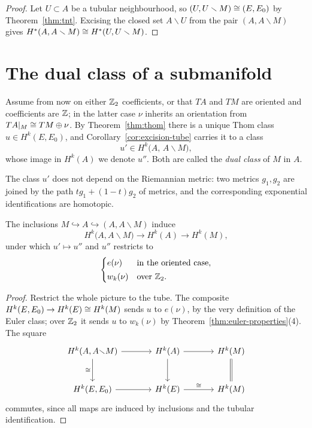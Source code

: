 \begin{proof}
Let $U\subset A$ be a tubular neighbourhood, so $(U,U\smallsetminus M)\cong
(E,E_0)$ by Theorem~\ref{thm:tnt}. Excising the closed set
$A\smallsetminus U$ from the pair $(A,A\smallsetminus M)$ gives
$H^*(A,A\smallsetminus M)\cong H^*(U,U\smallsetminus M)$.
\end{proof}

\section{The dual class of a submanifold}

Assume from now on either $\mathbb{Z}_2$ coefficients, or that $TA$ and $TM$ are
oriented and coefficients are $\mathbb{Z}$; in the latter case $\nu$ inherits an
orientation from $TA|_M\cong TM\oplus\nu$. By Theorem~\ref{thm:thom} there is a
unique Thom class $u\in H^k(E,E_0)$, and Corollary~\ref{cor:excision-tube}
carries it to a class
\[
u'\in H^k\big(A,\,A\smallsetminus M\big),
\]
whose image in $H^k(A)$ we denote $u''$. Both are called the \emph{dual class}
of $M$ in $A$.

\begin{remark}
The class $u'$ does not depend on the Riemannian metric: two metrics $g_1,g_2$
are joined by the path $tg_1+(1-t)g_2$ of metrics, and the corresponding
exponential identifications are homotopic.
\end{remark}

\begin{theorem}\label{thm:dual-restricts-euler}
The inclusions $M\hookrightarrow A\hookrightarrow(A,A\smallsetminus M)$ induce
\[
H^k\big(A,A\smallsetminus M\big)\longrightarrow H^k(A)\longrightarrow H^k(M),
\]
under which $u'\mapsto u''$ and $u''$ restricts to
\[
\begin{cases}
e(\nu)&\text{in the oriented case},\\[2pt]
w_k(\nu)&\text{over }\mathbb{Z}_2 .
\end{cases}
\]
\end{theorem}

\begin{proof}
Restrict the whole picture to the tube. The composite
$H^k(E,E_0)\to H^k(E)\cong H^k(M)$ sends $u$ to $e(\nu)$, by the very definition
of the Euler class; over $\mathbb{Z}_2$ it sends $u$ to $w_k(\nu)$ by
Theorem~\ref{thm:euler-properties}(4). The square
\[
\begin{tikzcd}[row sep=large, column sep=large]
H^k(A,A{\smallsetminus}M)\arrow[r]\arrow[d,"\iso"'] & H^k(A)\arrow[r]\arrow[d]
& H^k(M)\arrow[d,equal]\\
H^k(E,E_0)\arrow[r] & H^k(E)\arrow[r,"\iso"] & H^k(M)
\end{tikzcd}
\]
commutes, since all maps are induced by inclusions and the tubular
identification.
\end{proof}

